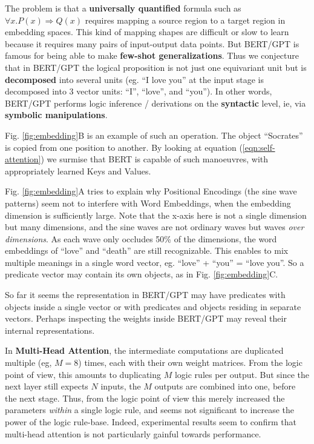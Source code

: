 \documentclass[orivec]{llncs}
\begin{document}
The problem is that a \textbf{universally quantified} formula such as $\forall x. P(x) \Rightarrow Q(x)$ requires mapping a source region to a target region in embedding spaces.  This kind of mapping shapes are difficult or slow to learn because it requires many pairs of input-output data points.  But BERT/GPT is famous for being able to make \textbf{few-shot generalizations}.  Thus we conjecture that in BERT/GPT the logical proposition is not just one equivariant unit but is \textbf{decomposed} into several units (eg. ``I love you'' at the input stage is decomposed into 3 vector units: ``I'', ``love'', and ``you'').  In other words, BERT/GPT performs logic inference / derivations on the \textbf{syntactic} level, ie, via \textbf{symbolic manipulations}.

Fig. \ref{fig:embedding}B is an example of such an operation.  The object ``Socrates'' is copied from one position to another.  By looking at equation (\ref{eqn:self-attention}) we surmise that BERT is capable of such manoeuvres, with appropriately learned Keys and Values.

Fig. \ref{fig:embedding}A tries to explain why Positional Encodings (the sine wave patterns) seem not to interfere with Word Embeddings, when the embedding dimension is sufficiently large.  Note that the x-axis here is not a single dimension but many dimensions, and the sine waves are not ordinary waves but waves \textit{over dimensions}.  As each wave only occludes 50\% of the dimensions, the word embeddings of ``love'' and ``death'' are still recognizable.  This enables to mix multiple meanings in a single word vector, eg. ``love'' + ``you'' = ``love you''.  So a predicate vector may contain its own objects, as in Fig. \ref{fig:embedding}C.

So far it seems the representation in BERT/GPT may have predicates with objects inside a single vector or with predicates and objects residing in separate vectors.  Perhaps inspecting the weights inside BERT/GPT may reveal their internal representations.

In \textbf{Multi-Head Attention}, the intermediate computations are duplicated multiple (eg, $M = 8$) times, each with their own weight matrices.  From the logic point of view, this amounts to duplicating $M$ logic rules per output.  But since the next layer still expects $N$ inputs, the $M$ outputs are combined into one, before the next stage.  Thus, from the logic point of view this merely increased the parameters \textit{within} a single logic rule, and seems not significant to increase the power of the logic rule-base.  Indeed, experimental results seem to confirm that multi-head attention is not particularly gainful towards performance.
\end{document}
